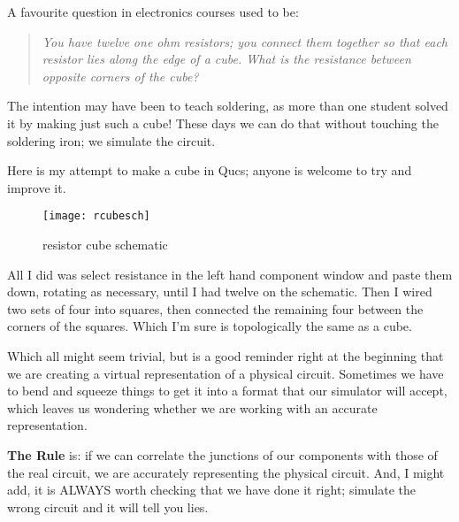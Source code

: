 %
%
%
%


A favourite question in electronics courses used to be:

\begin{quotation}
\textit{You have twelve one ohm resistors; you connect them together
so that each resistor lies along the edge of a cube. What is the
resistance between opposite corners of the cube?}
\end{quotation}

The intention may have been to teach soldering, as more than one
student solved it by making just such a cube! These days we can do
that without touching the soldering iron; we simulate the circuit.

\addvspace{12pt}

Here is my attempt to make a cube in Qucs; anyone is welcome to try
and improve it.

\begin{figure}[ht]
  \centering
  \texttt{[image: rcubesch]}
  \caption{resistor cube schematic}
  \label{fig:rcubesch}
\end{figure}
\FloatBarrier

All I did was select resistance in the left hand component window and
paste them down, rotating as necessary, until I had twelve on the
schematic.  Then I wired two sets of four into squares, then connected
the remaining four between the corners of the squares.  Which I'm sure
is topologically the same as a cube.

\addvspace{12pt}

Which all might seem trivial, but is a good reminder right at the
beginning that we are creating a virtual representation of a physical
circuit.  Sometimes we have to bend and squeeze things to get it into a
format that our simulator will accept, which leaves us wondering
whether we are working with an accurate representation.

\addvspace{12pt}

\textbf{The Rule} is: if we can correlate the junctions of our
components with those of the real circuit, we are accurately
representing the physical circuit.  And, I might add, it is ALWAYS
worth checking that we have done it right; simulate the wrong circuit
and it will tell you lies.

